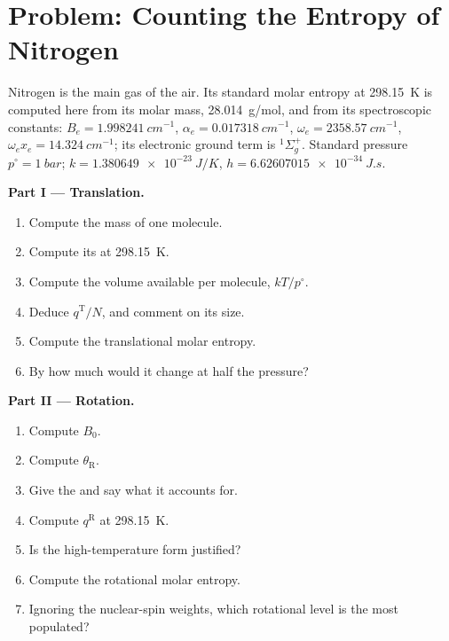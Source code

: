 \section{Problem: Counting the Entropy of Nitrogen}

\begin{problem}
\label{pb:b3:partition-functions:1}
Nitrogen is the main gas of the air. Its standard molar entropy at
\qty{298.15}{K} is computed here from its molar mass, \qty{28.014}{g/mol}, and from its
spectroscopic constants: $B_e = \qty{1.998241}{cm^{-1}}$, $\alpha_e = \qty{0.017318}{cm^{-1}}$, $\omega_e =
\qty{2358.57}{cm^{-1}}$, $\omega_ex_e = \qty{14.324}{cm^{-1}}$; its electronic ground term is ${}^1\Sigma_g^+$.
Standard pressure $p^\circ = \qty{1}{bar}$; $k = \qty{1.380649e-23}{J/K}$, $h = \qty{6.62607015e-34}{J.s}$.

\medskip\noindent\textbf{Part I --- Translation.}
\begin{enumerate}
  \item Compute the mass of one molecule.
  \item Compute its  at \qty{298.15}{K}.
  \item Compute the volume available per molecule, $kT/p^\circ$.
  \item Deduce $q^{\mathrm T}/N$, and comment on its size.
  \item Compute the translational molar entropy.
  \item By how much would it change at half the pressure?
\end{enumerate}

\medskip\noindent\textbf{Part II --- Rotation.}
\begin{enumerate}[resume]
  \item Compute $B_0$.
  \item Compute $\theta_{\mathrm R}$.
  \item Give the  and say what it accounts for.
  \item Compute $q^{\mathrm R}$ at \qty{298.15}{K}.
  \item Is the high-temperature form justified?
  \item Compute the rotational molar entropy.
  \item Ignoring the nuclear-spin weights, which rotational level is the most
        populated?
\end{enumerate}


\end{problem}
